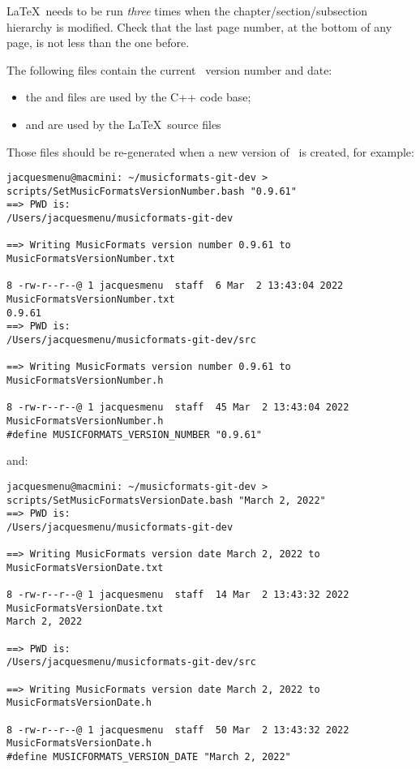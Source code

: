 \LaTeX\ needs to be run {\it three} times when the chapter/section/subsection hierarchy is modified. Check that the last page number, at the bottom of any page, is not less than the one before.

The following files contain the current \mf\ version number and date:
\begin{itemize}
\item the  and  files are used by the C++ code base;
\item {} and  are used by the \LaTeX\ source files
\end{itemize}
Those files should be re-generated when a new version of \mf\ is created, for example:
\begin{lstlisting}[language=Terminal]
jacquesmenu@macmini: ~/musicformats-git-dev > scripts/SetMusicFormatsVersionNumber.bash "0.9.61"
==> PWD is:
/Users/jacquesmenu/musicformats-git-dev

==> Writing MusicFormats version number 0.9.61 to MusicFormatsVersionNumber.txt

8 -rw-r--r--@ 1 jacquesmenu  staff  6 Mar  2 13:43:04 2022 MusicFormatsVersionNumber.txt
0.9.61
==> PWD is:
/Users/jacquesmenu/musicformats-git-dev/src

==> Writing MusicFormats version number 0.9.61 to MusicFormatsVersionNumber.h

8 -rw-r--r--@ 1 jacquesmenu  staff  45 Mar  2 13:43:04 2022 MusicFormatsVersionNumber.h
#define MUSICFORMATS_VERSION_NUMBER "0.9.61"
\end{lstlisting}

and:

\begin{lstlisting}[language=Terminal]
jacquesmenu@macmini: ~/musicformats-git-dev > scripts/SetMusicFormatsVersionDate.bash "March 2, 2022"
==> PWD is:
/Users/jacquesmenu/musicformats-git-dev

==> Writing MusicFormats version date March 2, 2022 to MusicFormatsVersionDate.txt

8 -rw-r--r--@ 1 jacquesmenu  staff  14 Mar  2 13:43:32 2022 MusicFormatsVersionDate.txt
March 2, 2022

==> PWD is:
/Users/jacquesmenu/musicformats-git-dev/src

==> Writing MusicFormats version date March 2, 2022 to MusicFormatsVersionDate.h

8 -rw-r--r--@ 1 jacquesmenu  staff  50 Mar  2 13:43:32 2022 MusicFormatsVersionDate.h
#define MUSICFORMATS_VERSION_DATE "March 2, 2022"
\end{lstlisting}


